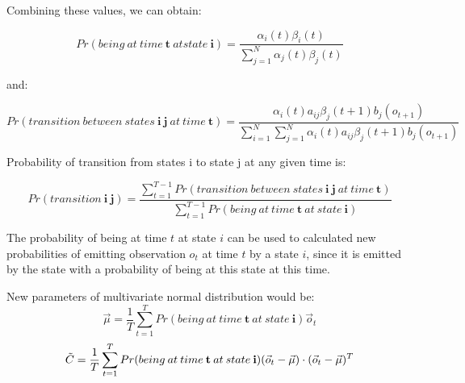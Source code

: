 \documentclass[12pt,a4paper,english]{article}
\begin{document}
\newpage

Combining these values, we can obtain:

\begin{equation}
    Pr(being \: at \: time \: \boldsymbol{t} \: at state \: \boldsymbol{i}) = \frac {\alpha_i(t)\beta_i(t)} {\sum_{j=1}^{N} \alpha_j(t)\beta_j(t) }
\end{equation}
	
and:
	
\begin{equation}
    Pr(transition \: between \: states \: \boldsymbol{i} \: \boldsymbol{j} \: at \: time \: \boldsymbol{t}) = \frac {\alpha_i(t)a_{ij}\beta_j(t + 1)b_j(o_{t+1})} {\sum_{i=1}^{N} \sum_{j=1}^{N} \alpha_i(t)a_{ij}\beta_j(t + 1)b_j(o_{t+1})}
\end{equation}

Probability of transition from states i to state j at any given time is:
	
\begin{equation}
    Pr(transition \: \boldsymbol{i} \: \boldsymbol{j}) = \frac {\sum_{t=1}^{T-1} Pr(transition \: between \: states \: \boldsymbol{i} \: \boldsymbol{j} \: at \: time \: \boldsymbol{t})} {\sum_{t=1}^{T-1} Pr(being \: at \: time \: \boldsymbol{t} \: at \: state \: \boldsymbol{i}) }
\end{equation}
	

The probability of being at time $t$ at state $i$ can be used to calculated new probabilities of emitting observation $o_t$ at time $t$ by a state $i$,
since it is emitted by the state with a probability of being at this state at this time. \newline

New parameters of multivariate normal distribution would be:
\begin{equation}
    \vec \mu = \frac 1 T \sum_{t=1}^{T} Pr(being \: at \: time \: \boldsymbol{t} \: at \: state \: \boldsymbol{i}) \vec o_t
\end{equation}
\begin{equation}
    \tilde C = \frac 1 T \sum_{t=1}^{T} Pr(being \: at \: time \: \bold{t} \: at \: state \: \bold{i})(\vec o_t - \vec \mu) \cdot (\vec o_t - \vec \mu)^T
\end{equation}
\end{document}
